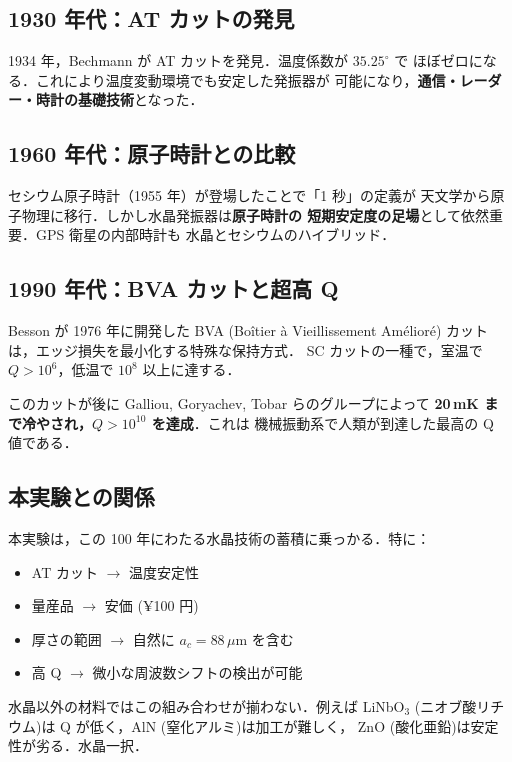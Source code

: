 \documentclass[11pt,a4paper]{article}
\begin{document}
\subsection{1930 年代：AT カットの発見}

1934 年，Bechmann が AT カットを発見．温度係数が $35.25^\circ$ で
ほぼゼロになる．これにより温度変動環境でも安定した発振器が
可能になり，\textbf{通信・レーダー・時計の基礎技術}となった．

\subsection{1960 年代：原子時計との比較}

セシウム原子時計（1955 年）が登場したことで「1 秒」の定義が
天文学から原子物理に移行．しかし水晶発振器は\textbf{原子時計の
短期安定度の足場}として依然重要．GPS 衛星の内部時計も
水晶とセシウムのハイブリッド．

\subsection{1990 年代：BVA カットと超高 Q}

Besson が 1976 年に開発した BVA (Boîtier à Vieillissement
Amélioré) カットは，エッジ損失を最小化する特殊な保持方式．
SC カットの一種で，室温で $Q > 10^6$，低温で $10^8$ 以上に達する．

このカットが後に Galliou, Goryachev, Tobar らのグループによって
\textbf{20\,mK まで冷やされ，$Q > 10^{10}$ を達成}．これは
機械振動系で人類が到達した最高の Q 値である．

\subsection{本実験との関係}

本実験は，この 100 年にわたる水晶技術の蓄積に乗っかる．特に：
\begin{itemize}
\item AT カット $\to$ 温度安定性
\item 量産品 $\to$ 安価 (¥100 円)
\item 厚さの範囲 $\to$ 自然に $a_c = 88\,\mu$m を含む
\item 高 Q $\to$ 微小な周波数シフトの検出が可能
\end{itemize}

水晶以外の材料ではこの組み合わせが揃わない．例えば LiNbO$_3$
(ニオブ酸リチウム)は Q が低く，AlN (窒化アルミ)は加工が難しく，
ZnO (酸化亜鉛)は安定性が劣る．水晶一択．
\end{document}
